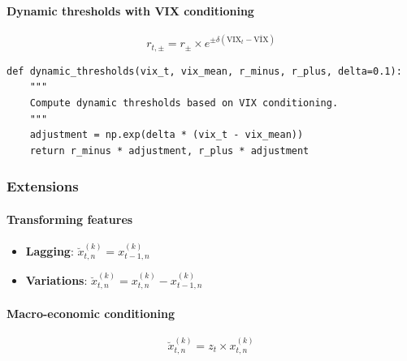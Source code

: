 \paragraph{Dynamic thresholds with VIX conditioning}

\begin{equation}
r_{t,\pm} = r_{\pm} \times e^{\pm\delta(\text{VIX}_t - \bar{\text{VIX}})}
\end{equation}

\begin{verbatim}
def dynamic_thresholds(vix_t, vix_mean, r_minus, r_plus, delta=0.1):
    """
    Compute dynamic thresholds based on VIX conditioning.
    """
    adjustment = np.exp(delta * (vix_t - vix_mean))
    return r_minus * adjustment, r_plus * adjustment
\end{verbatim}

\subsubsection{Extensions}

\paragraph{Transforming features}

\begin{itemize}
\item \textbf{Lagging}: $\breve{x}_{t,n}^{(k)} = x_{t -1,n}^{(k)}$
\item \textbf{Variations}: $\breve{x}_{t,n}^{(k)} = x_{t,n}^{(k)} - x_{t -1,n}^{(k)}$
\end{itemize}

\paragraph{Macro-economic conditioning}

\begin{equation}
\breve{x}_{t,n}^{(k)} = z_t \times x_{t,n}^{(k)}
\end{equation}

